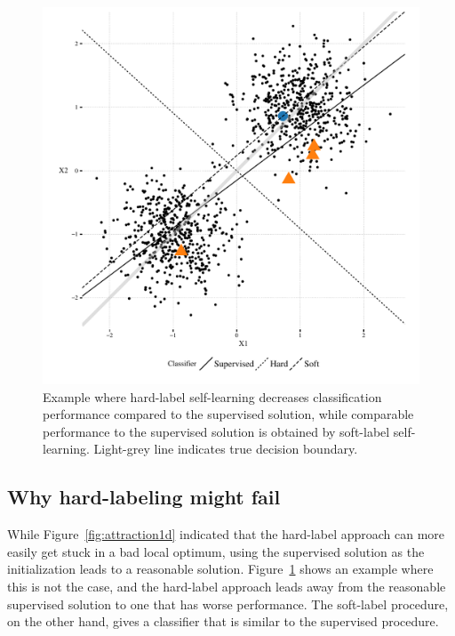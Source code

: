 \documentclass[conference,a4paper,10pt]{IEEEtran}\usepackage[]{graphicx}\usepackage[]{color}
\makeatletter
\def\maxwidth{ %
  \ifdim\Gin@nat@width>\linewidth
    \linewidth
  \else
    \Gin@nat@width
  \fi
}
\newenvironment{knitrout}{}{} %
\makeatother
\begin{document}
\begin{knitrout}
\color{fgcolor}\begin{figure}
\includegraphics[width=\maxwidth]{figure/example-1} \caption[Example where hard-label self-learning decreases classification performance compared to the supervised solution, while comparable performance to the supervised solution is obtained by soft-label self-learning]{Example where hard-label self-learning decreases classification performance compared to the supervised solution, while comparable performance to the supervised solution is obtained by soft-label self-learning. Light-grey line indicates true decision boundary.}\label{fig:example}
\end{figure}


\end{knitrout}


\subsection{Why hard-labeling might fail}
While Figure~\ref{fig:attraction1d} indicated that the hard-label approach can more easily get stuck in a bad local optimum, using the supervised solution as the initialization leads to a reasonable solution. Figure~\ref{fig:example} shows an example where this is not the case, and the hard-label approach leads away from the reasonable supervised solution to one that has worse performance. The soft-label procedure, on the other hand, gives a classifier that is similar to the supervised procedure.
\end{document}
